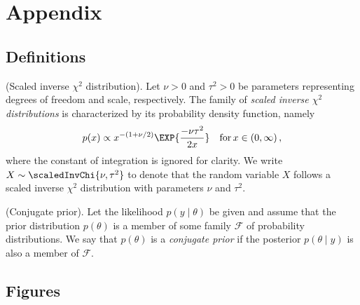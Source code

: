 \section{Appendix}

\subsection{Definitions}
\begin{definition}{(Scaled inverse $\chi^2$ distribution).}\label{def:scaledInverseChi}
  Let $\nu > 0$ and $\tau^2 > 0$ be parameters representing degrees of freedom and scale, respectively. The family of \emph{scaled inverse $\chi^2$ distributions} is characterized by its probability density function, namely
  \begin{align*}
    p(x) \propto x^{-(1 + \nu / 2)} \EXP{\frac{-\nu \tau^2}{2 x}} \quad \text{for} \, x \in (0, \infty) \,,
  \end{align*}
  where the constant of integration is ignored for clarity.
  We write $X \sim \scaledInvChi{\nu, \tau^2}$ to denote that the random variable $X$ follows a scaled inverse $\chi^2$ distribution with parameters $\nu$ and $\tau^2$.
\end{definition}

\begin{definition}{(Conjugate prior).}\label{def:conjugate_prior}
Let the likelihood $p(y \mid \theta)$ be given and assume that the prior distribution $p(\theta)$ is a member of some family $\mathcal{F}$ of probability distributions.
We say that $p(\theta)$ is a \emph{conjugate prior} if the posterior $p(\theta \mid y)$ is also a member of $\mathcal{F}$.
\end{definition}

\subsection{Figures}

